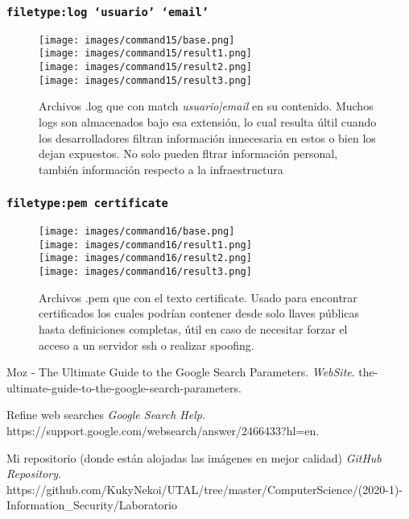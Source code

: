 \documentclass[11pt]{utalcaDoc}
\begin{document}
\subsubsection{\texttt{filetype:log \enquote*{usuario} \enquote*{email}}}
\begin{figure}[H]
	\centering
\begin{multicols}{4}
	\texttt{[image: images/command15/base.png]}\\
	\texttt{[image: images/command15/result1.png]}\\
	\texttt{[image: images/command15/result2.png]}\\
	\texttt{[image: images/command15/result3.png]}\\
\end{multicols}
\caption{Archivos .log que con match \textit{usuario|email} en su contenido. Muchos logs son almacenados bajo esa extensión, lo cual resulta últil cuando los desarrolladores filtran información innecesaria en estos o bien los dejan expuestos. No solo pueden fltrar información personal, también información respecto a la infraestructura}
\label{FIG:command15}
\end{figure}



\subsubsection{\texttt{filetype:pem certificate}}
\begin{figure}[H]
	\centering
\begin{multicols}{4}
	\texttt{[image: images/command16/base.png]}\\
	\texttt{[image: images/command16/result1.png]}\\
	\texttt{[image: images/command16/result2.png]}\\
	\texttt{[image: images/command16/result3.png]}\\
\end{multicols}
\caption{Archivos .pem que con el texto certificate. Usado para encontrar certificados los cuales podrían contener desde solo llaves públicas hasta definiciones completas, útil en caso de necesitar forzar el acceso a un servidor ssh o realizar spoofing.}
\label{FIG:command16}
\end{figure}

\begin{thebibliography}{9}
	Moz - The Ultimate Guide to the Google Search Parameters.
	\textit{WebSite}.
	the-ultimate-guide-to-the-google-search-parameters.


	Refine web searches
	\textit{Google Search Help}.
	https://support.google.com/websearch/answer/2466433?hl=en.

	Mi repositorio (donde están alojadas las imágenes en mejor calidad)
	\textit{GitHub Repository}.
	https://github.com/KukyNekoi/UTAL/tree/master/ComputerScience/(2020-1)-Information_Security/Laboratorio%
\end{thebibliography}
\end{document}
